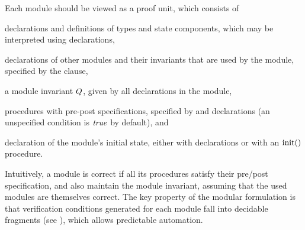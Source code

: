 Each module should be viewed as a proof unit, which consists of
\begin{inparaenum}[(1)]
\item declarations and definitions of types and state components, which may be interpreted using  declarations,
\item declarations of other modules and their invariants that are used by the module, specified by the  clause,
\item a module invariant $Q$, given by all  declarations in the module,
\item procedures with pre-post specifications, specified by  and  declarations (an
unspecified condition is ${\textit{true}}$ by default), and
\item declaration of the module's initial state, either with  declarations or with an ${\text{init}}()$ procedure.
\end{inparaenum}
Intuitively, a module is correct if all its procedures satisfy their pre/post specification, and also maintain the module invariant,
assuming that the used modules are themselves correct.
The key property of the modular formulation is that verification conditions generated for each module fall into decidable fragments (see ), which allows predictable automation.



